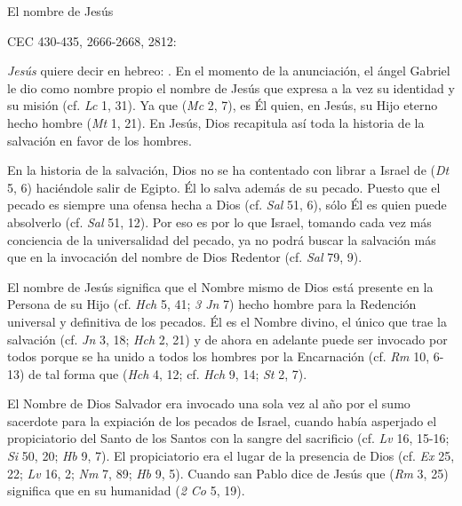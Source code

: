 	El nombre de Jesús
	
	CEC 430-435, 2666-2668, 2812:
	
	 \emph{Jesús} quiere decir en hebreo: . En el momento de la anunciación, el ángel Gabriel le dio como nombre propio el nombre de Jesús que expresa a la vez su identidad y su misión (cf. \emph{Lc} 1, 31). Ya que  (\emph{Mc} 2, 7), es Él quien, en Jesús, su Hijo eterno hecho hombre  (\emph{Mt} 1, 21). En Jesús, Dios recapitula así toda la historia de la salvación en favor de los hombres.
	
	 En la historia de la salvación, Dios no se ha contentado con librar a Israel de  (\emph{Dt} 5, 6) haciéndole salir de Egipto. Él lo salva además de su pecado. Puesto que el pecado es siempre una ofensa hecha a Dios (cf. \emph{Sal} 51, 6), sólo Él es quien puede absolverlo (cf. \emph{Sal} 51, 12). Por eso es por lo que Israel, tomando cada vez más conciencia de la universalidad del pecado, ya no podrá buscar la salvación más que en la invocación del nombre de Dios Redentor (cf. \emph{Sal} 79, 9).
	
	 El nombre de Jesús significa que el Nombre mismo de Dios está presente en la Persona de su Hijo (cf. \emph{Hch} 5, 41; \emph{3 Jn} 7) hecho hombre para la Redención universal y definitiva de los pecados. Él es el Nombre divino, el único que trae la salvación (cf. \emph{Jn} 3, 18; \emph{Hch} 2, 21) y de ahora en adelante puede ser invocado por todos porque se ha unido a todos los hombres por la Encarnación (cf. \emph{Rm} 10, 6-13) de tal forma que  (\emph{Hch} 4, 12; cf. \emph{Hch} 9, 14; \emph{St} 2, 7).
	
	 El Nombre de Dios Salvador era invocado una sola vez al año por el sumo sacerdote para la expiación de los pecados de Israel, cuando había asperjado el propiciatorio del Santo de los Santos con la sangre del sacrificio (cf. \emph{Lv} 16, 15-16; \emph{Si} 50, 20; \emph{Hb} 9, 7). El propiciatorio era el lugar de la presencia de Dios (cf. \emph{Ex} 25, 22; \emph{Lv} 16, 2; \emph{Nm} 7, 89; \emph{Hb} 9, 5). Cuando san Pablo dice de Jesús que  (\emph{Rm} 3, 25) significa que en su humanidad  (\emph{2 Co} 5, 19).
	
